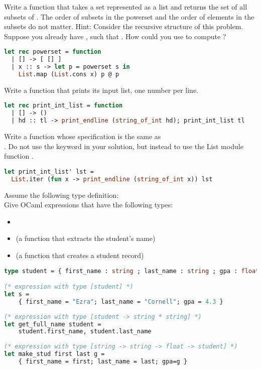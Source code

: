 \problem[powerset]
Write a function  that takes a set  represented as a list and returns the set of all subsets of . The order of subsets in the powerset and the order of elements in the subsets do not matter.
Hint: Consider the recursive structure of this problem. Suppose you already have , such that . How could you use  to compute ?

\begin{lstlisting}[language=OCaml]
let rec powerset = function
  | [] -> [ [] ]
  | x :: s -> let p = powerset s in
    List.map (List.cons x) p @ p
\end{lstlisting}

Write a function  that prints its input list, one number per line.

\begin{lstlisting}[language=OCaml]
let rec print_int_list = function
  | [] -> ()
  | hd :: tl -> print_endline (string_of_int hd); print_int_list tl
\end{lstlisting}

Write a function  whose specification is the same as \\
. Do not use the keyword  in your solution, but instead to use the List module function .

\begin{lstlisting}[language=OCaml]
let print_int_list' lst =
  List.iter (fun x -> print_endline (string_of_int x)) lst
\end{lstlisting}

\problem[student]
Assume the following type definition:
 \\
Give OCaml expressions that have the following types:
\begin{itemize}
  \item {}
  \item {} (a function that extracts the student's name)
  \item {} (a function that creates a student record)
\end{itemize}

\begin{lstlisting}[language=OCaml]
type student = { first_name : string ; last_name : string ; gpa : float }

(* expression with type [student] *)
let s =
	{ first_name = "Ezra"; last_name = "Cornell"; gpa = 4.3 }
	
(* expression with type [student -> string * string] *)
let get_full_name student =
	student.first_name, student.last_name
	
(* expression with type [string -> string -> float -> student] *)
let make_stud first last g =
	{ first_name = first; last_name = last; gpa=g }
\end{lstlisting}


